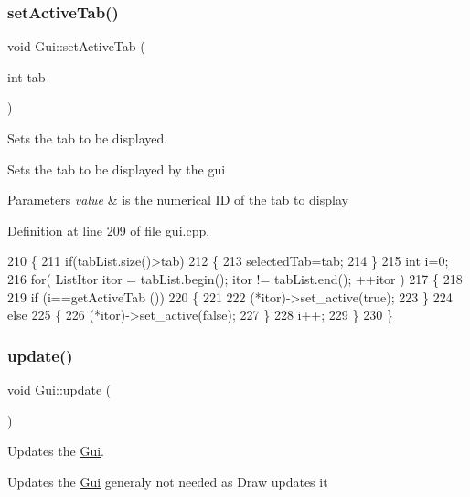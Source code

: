 \subsubsection{\texorpdfstring{set\+Active\+Tab()}{setActiveTab()}\hspace{0.1cm}{\footnotesize\ttfamily [2/2]}}
{\footnotesize\ttfamily void Gui\+::set\+Active\+Tab (\begin{DoxyParamCaption}\item[{int}]{tab }\end{DoxyParamCaption})}



Sets the tab to be displayed. 

Sets the tab to be displayed by the gui 
\begin{DoxyParams}{Parameters}
{\em value} & is the numerical ID of the tab to display \\
\hline
\end{DoxyParams}


Definition at line 209 of file gui.\+cpp.


\begin{DoxyCode}
210 \{
211     \textcolor{keywordflow}{if}(tabList.size()>tab)
212     \{
213         selectedTab=tab;
214     \}
215     \textcolor{keywordtype}{int} i=0;
216     \textcolor{keywordflow}{for}( ListItor itor = tabList.begin(); itor != tabList.end(); ++itor )
217     \{
218      
219         \textcolor{keywordflow}{if} (i==getActiveTab ())
220         \{
221             
222             (*itor)->set\_active(\textcolor{keyword}{true});
223         \}
224         \textcolor{keywordflow}{else}
225         \{
226             (*itor)->set\_active(\textcolor{keyword}{false});
227         \}
228         i++;
229     \}
230 \}
\end{DoxyCode}
\mbox{\label{class_gui_af057adcdd96ee8b8021519d68ed9042e}} 
\subsubsection{\texorpdfstring{update()}{update()}}
{\footnotesize\ttfamily void Gui\+::update (\begin{DoxyParamCaption}{ }\end{DoxyParamCaption})}



Updates the \hyperlink{class_gui}{Gui}. 

Updates the \hyperlink{class_gui}{Gui} generaly not needed as Draw updates it 

